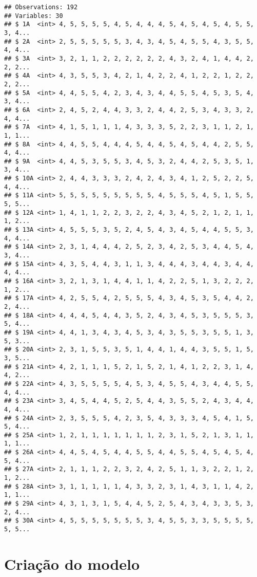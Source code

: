 \documentclass[]{article}
\begin{document}
\begin{verbatim}
## Observations: 192
## Variables: 30
## $ 1A  <int> 4, 5, 5, 5, 5, 4, 5, 4, 4, 4, 5, 4, 5, 4, 5, 4, 5, 5, 3, 4...
## $ 2A  <int> 2, 5, 5, 5, 5, 5, 3, 4, 3, 4, 5, 4, 5, 5, 4, 3, 5, 5, 4, 4...
## $ 3A  <int> 3, 2, 1, 1, 2, 2, 2, 2, 2, 2, 4, 3, 2, 4, 1, 4, 4, 2, 2, 2...
## $ 4A  <int> 4, 3, 5, 5, 3, 4, 2, 1, 4, 2, 2, 4, 1, 2, 2, 1, 2, 2, 2, 2...
## $ 5A  <int> 4, 4, 5, 5, 4, 2, 3, 4, 3, 4, 4, 5, 5, 4, 5, 3, 5, 4, 3, 4...
## $ 6A  <int> 2, 4, 5, 2, 4, 4, 3, 3, 2, 4, 4, 2, 5, 3, 4, 3, 3, 2, 4, 4...
## $ 7A  <int> 4, 1, 5, 1, 1, 1, 4, 3, 3, 3, 5, 2, 2, 3, 1, 1, 2, 1, 1, 1...
## $ 8A  <int> 4, 4, 5, 5, 4, 4, 4, 5, 4, 4, 5, 4, 5, 4, 4, 2, 5, 5, 4, 4...
## $ 9A  <int> 4, 4, 5, 3, 5, 5, 3, 4, 5, 3, 2, 4, 4, 2, 5, 3, 5, 1, 3, 4...
## $ 10A <int> 2, 4, 4, 3, 3, 3, 2, 4, 2, 4, 3, 4, 1, 2, 5, 2, 2, 5, 4, 4...
## $ 11A <int> 5, 5, 5, 5, 5, 5, 5, 5, 5, 4, 5, 5, 5, 4, 5, 1, 5, 5, 5, 5...
## $ 12A <int> 1, 4, 1, 1, 2, 2, 3, 2, 2, 4, 3, 4, 5, 2, 1, 2, 1, 1, 1, 2...
## $ 13A <int> 4, 5, 5, 5, 3, 5, 2, 4, 5, 4, 3, 4, 5, 4, 4, 5, 5, 3, 4, 4...
## $ 14A <int> 2, 3, 1, 4, 4, 4, 2, 5, 2, 3, 4, 2, 5, 3, 4, 4, 5, 4, 3, 4...
## $ 15A <int> 4, 3, 5, 4, 4, 3, 1, 1, 3, 4, 4, 4, 3, 4, 4, 3, 4, 4, 4, 4...
## $ 16A <int> 3, 2, 1, 3, 1, 4, 4, 1, 1, 4, 2, 2, 5, 1, 3, 2, 2, 2, 1, 2...
## $ 17A <int> 4, 2, 5, 5, 4, 2, 5, 5, 5, 4, 3, 4, 5, 3, 5, 4, 4, 2, 2, 4...
## $ 18A <int> 4, 4, 4, 5, 4, 4, 3, 5, 2, 4, 3, 4, 5, 3, 5, 5, 5, 3, 5, 4...
## $ 19A <int> 4, 4, 1, 3, 4, 3, 4, 5, 3, 4, 3, 5, 5, 3, 5, 5, 1, 3, 5, 3...
## $ 20A <int> 2, 3, 1, 5, 5, 3, 5, 1, 4, 4, 1, 4, 4, 3, 5, 5, 1, 5, 3, 5...
## $ 21A <int> 4, 2, 1, 1, 1, 5, 2, 1, 5, 2, 1, 4, 1, 2, 2, 3, 1, 4, 4, 2...
## $ 22A <int> 4, 3, 5, 5, 5, 5, 4, 5, 3, 4, 5, 5, 4, 3, 4, 4, 5, 5, 4, 4...
## $ 23A <int> 3, 4, 5, 4, 4, 5, 2, 5, 4, 4, 3, 5, 5, 2, 4, 3, 4, 4, 4, 4...
## $ 24A <int> 2, 3, 5, 5, 5, 4, 2, 3, 5, 4, 3, 3, 3, 4, 5, 4, 1, 5, 5, 4...
## $ 25A <int> 1, 2, 1, 1, 1, 1, 1, 1, 1, 2, 3, 1, 5, 2, 1, 3, 1, 1, 1, 1...
## $ 26A <int> 4, 4, 5, 4, 5, 4, 4, 5, 5, 4, 4, 5, 5, 4, 5, 4, 5, 4, 5, 4...
## $ 27A <int> 2, 1, 1, 1, 2, 2, 3, 2, 4, 2, 5, 1, 1, 3, 2, 2, 1, 2, 1, 2...
## $ 28A <int> 3, 1, 1, 1, 1, 1, 4, 3, 3, 2, 3, 1, 4, 3, 1, 1, 4, 2, 1, 1...
## $ 29A <int> 4, 3, 1, 3, 1, 5, 4, 4, 5, 2, 5, 4, 3, 4, 3, 3, 5, 3, 2, 4...
## $ 30A <int> 4, 5, 5, 5, 5, 5, 5, 5, 3, 4, 5, 5, 3, 3, 5, 5, 5, 5, 5, 5...
\end{verbatim}

\section{Criação do modelo}\label{criacao-do-modelo}
\end{document}
